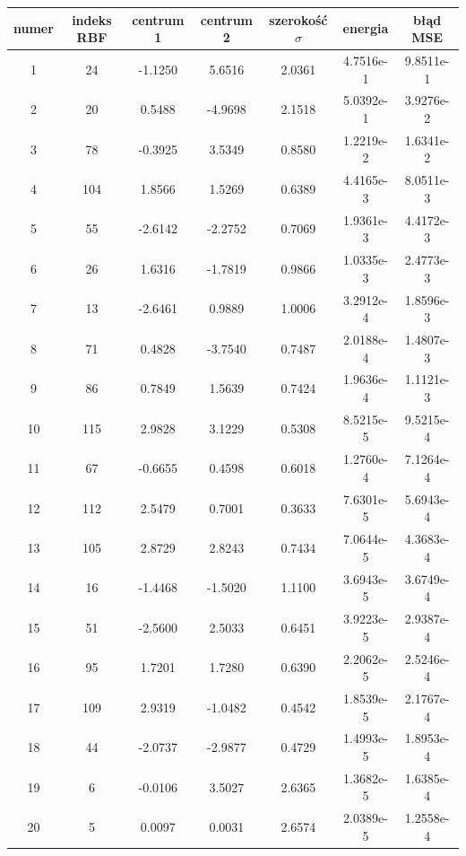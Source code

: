 \begin{table}[ht!]
\centering

\begin{tabular}{ |c| c| c| c| c| c| c| }
\hline
numer & indeks RBF & centrum 1 & centrum 2 & szerokość $\sigma$ & energia      & błąd MSE    \\ \hline    
    1 &  24 &  -1.1250  &  5.6516  &  2.0361  &  4.7516e-1 & 9.8511e-1   \\
    2 &  20 &   0.5488  & -4.9698  &  2.1518  &  5.0392e-1 & 3.9276e-2   \\
    3 &  78 &  -0.3925  &  3.5349  &  0.8580  &  1.2219e-2 & 1.6341e-2   \\
    4 & 104 &   1.8566  &  1.5269  &  0.6389  &  4.4165e-3 & 8.0511e-3   \\
    5 &  55 &  -2.6142  & -2.2752  &  0.7069  &  1.9361e-3 & 4.4172e-3   \\
    6 &  26 &   1.6316  & -1.7819  &  0.9866  &  1.0335e-3 & 2.4773e-3   \\
    7 &  13 &  -2.6461  &  0.9889  &  1.0006  &  3.2912e-4 & 1.8596e-3   \\
    8 &  71 &   0.4828  & -3.7540  &  0.7487  &  2.0188e-4 & 1.4807e-3   \\
    9 &  86 &   0.7849  &  1.5639  &  0.7424  &  1.9636e-4 & 1.1121e-3   \\
   10 & 115 &   2.9828  &  3.1229  &  0.5308  &  8.5215e-5 & 9.5215e-4   \\
   11 &  67 &  -0.6655  &  0.4598  &  0.6018  &  1.2760e-4 & 7.1264e-4   \\
   12 & 112 &   2.5479  &  0.7001  &  0.3633  &  7.6301e-5 & 5.6943e-4   \\
   13 & 105 &   2.8729  &  2.8243  &  0.7434  &  7.0644e-5 & 4.3683e-4   \\
   14 &  16 &  -1.4468  & -1.5020  &  1.1100  &  3.6943e-5 & 3.6749e-4   \\
   15 &  51 &  -2.5600  &  2.5033  &  0.6451  &  3.9223e-5 & 2.9387e-4   \\
   16 &  95 &   1.7201  &  1.7280  &  0.6390  &  2.2062e-5 & 2.5246e-4   \\
   17 & 109 &   2.9319  & -1.0482  &  0.4542  &  1.8539e-5 & 2.1767e-4   \\
   18 &  44 &  -2.0737  & -2.9877  &  0.4729  &  1.4993e-5 & 1.8953e-4   \\
   19 &   6 &  -0.0106  &  3.5027  &  2.6365  &  1.3682e-5 & 1.6385e-4   \\
   20 &   5 &   0.0097  &  0.0031  &  2.6574  &  2.0389e-5 & 1.2558e-4   \\

\end{tabular}
\end{table}
